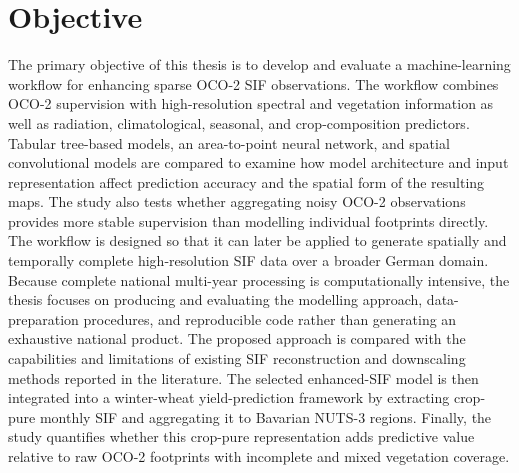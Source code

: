 \section{Objective}
The primary objective of this thesis is to develop and evaluate a machine-learning workflow for enhancing sparse OCO-2 SIF observations. The workflow combines OCO-2 supervision with high-resolution spectral and vegetation information as well as radiation, climatological, seasonal, and crop-composition predictors. Tabular tree-based models, an area-to-point neural network, and spatial convolutional models are compared to examine how model architecture and input representation affect prediction accuracy and the spatial form of the resulting maps. The study also tests whether aggregating noisy OCO-2 observations provides more stable supervision than modelling individual footprints directly. The workflow is designed so that it can later be applied to generate spatially and temporally complete high-resolution SIF data over a broader German domain. Because complete national multi-year processing is computationally intensive, the thesis focuses on producing and evaluating the modelling approach, data-preparation procedures, and reproducible code rather than generating an exhaustive national product. The proposed approach is compared with the capabilities and limitations of existing SIF reconstruction and downscaling methods reported in the literature. The selected enhanced-SIF model is then integrated into a winter-wheat yield-prediction framework by extracting crop-pure monthly SIF and aggregating it to Bavarian NUTS-3 regions. Finally, the study quantifies whether this crop-pure representation adds predictive value relative to raw OCO-2 footprints with incomplete and mixed vegetation coverage.

